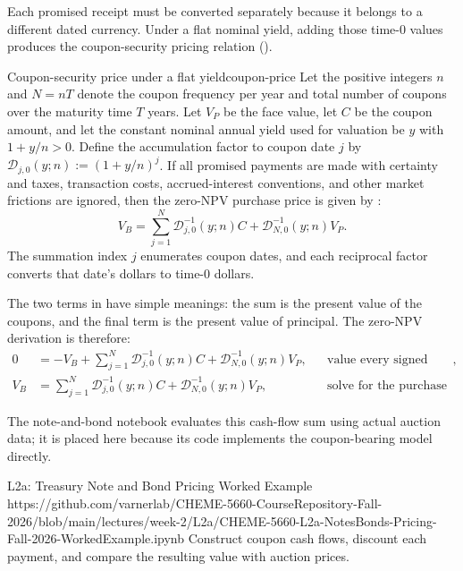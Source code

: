 \documentclass[11pt]{article}
\newcommand{\D}{\mathcal{D}}
\begin{document}
Each promised receipt must be converted separately because it belongs to a different dated currency. Under a flat nominal yield, adding those time-0 values produces the coupon-security pricing relation ().

\begin{theorem}{Coupon-security price under a flat yield}{coupon-price}
Let the positive integers $n$ and $N=nT$ denote the coupon frequency per year and total number of coupons over the maturity time $T$ years. Let $V_P$ be the face value, let $C$ be the coupon amount, and let the constant nominal annual yield used for valuation be $y$ with $1+y/n>0$. Define the accumulation factor to coupon date $j$ by $\D_{j,0}(y;n):=(1+y/n)^j$. If all promised payments are made with certainty and taxes, transaction costs, accrued-interest conventions, and other market frictions are ignored, then the zero-NPV purchase price is given by :
\begin{equation}
  \label{eq:coupon-price}
  V_B=\sum_{j=1}^{N}\D_{j,0}^{-1}(y;n)C+\D_{N,0}^{-1}(y;n)V_P.
\end{equation}
The summation index $j$ enumerates coupon dates, and each reciprocal factor converts that date's dollars to time-0 dollars.
\end{theorem}

The two terms in  have simple meanings: the sum is the present value of the coupons, and the final term is the present value of principal. The zero-NPV derivation is therefore:
\begin{align*}
  0
    &= -V_B+\sum_{j=1}^{N}\D_{j,0}^{-1}(y;n)C
       +\D_{N,0}^{-1}(y;n)V_P,
    && \text{value every signed cash flow at time 0},\\
  V_B
    &= \sum_{j=1}^{N}\D_{j,0}^{-1}(y;n)C
       +\D_{N,0}^{-1}(y;n)V_P,
    && \text{solve for the purchase price.}
\end{align*}

The note-and-bond notebook evaluates this cash-flow sum using actual auction data; it is placed here because its code implements the coupon-bearing model directly.

\newpage
\thispagestyle{fancy}
\notebooklink
  {L2a: Treasury Note and Bond Pricing Worked Example}
  {https://github.com/varnerlab/CHEME-5660-CourseRepository-Fall-2026/blob/main/lectures/week-2/L2a/CHEME-5660-L2a-NotesBonds-Pricing-Fall-2026-WorkedExample.ipynb}
  {Construct coupon cash flows, discount each payment, and compare the resulting value with auction prices.}
\end{document}
